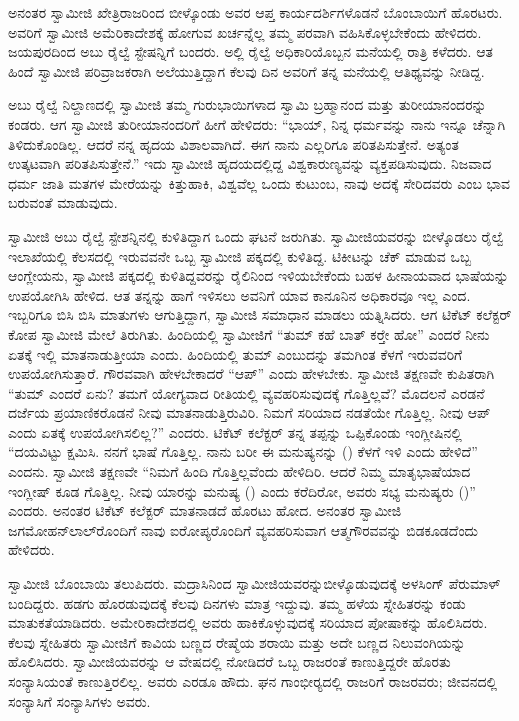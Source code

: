  ಅನಂತರ ಸ್ವಾಮೀಜಿ ಖೇತ್ರಿರಾಜರಿಂದ ಬೀಳ್ಕೊಂಡು ಅವರ ಆಪ್ತ ಕಾರ್ಯದರ್ಶಿಗಳೊಡನೆ ಬೊಂಬಾಯಿಗೆ ಹೊರಟರು. ಅವರಿಗೆ ಸ್ವಾಮೀಜಿ ಅಮೆರಿಕಾದೇಶಕ್ಕೆ ಹೋಗುವ ಖರ್ಚನ್ನೆಲ್ಲ ತಮ್ಮ ಪರವಾಗಿ ವಹಿಸಿಕೊಳ್ಳಬೇಕೆಂದು ಹೇಳಿದರು. ಜಯಪುರದಿಂದ ಅಬು ರೈಲ್ವೆ ಸ್ಟೇಷನ್ನಿಗೆ ಬಂದರು. ಅಲ್ಲಿ ರೈಲ್ವೆ ಅಧಿಕಾರಿಯೊಬ್ಬನ ಮನೆಯಲ್ಲಿ ರಾತ್ರಿ ಕಳೆದರು. ಆತ ಹಿಂದೆ ಸ್ವಾಮೀಜಿ ಪರಿವ್ರಾಜಕರಾಗಿ ಅಲೆಯುತ್ತಿದ್ದಾಗ ಕೆಲವು ದಿನ ಅವರಿಗೆ ತನ್ನ ಮನೆಯಲ್ಲಿ ಆತಿಥ್ಯವನ್ನು ನೀಡಿದ್ದ. 

ಅಬು ರೈಲ್ವೆ ನಿಲ್ದಾಣದಲ್ಲಿ ಸ್ವಾಮೀಜಿ ತಮ್ಮ ಗುರುಭಾಯಿಗಳಾದ ಸ್ವಾಮಿ ಬ್ರಹ್ಮಾನಂದ ಮತ್ತು ತುರೀಯಾನಂದರನ್ನು ಕಂಡರು. ಆಗ ಸ್ವಾಮೀಜಿ ತುರೀಯಾನಂದರಿಗೆ ಹೀಗೆ ಹೇಳಿದರು: “ಭಾಯ್, ನಿನ್ನ ಧರ್ಮವನ್ನು ನಾನು ಇನ್ನೂ ಚೆನ್ನಾಗಿ ತಿಳಿದುಕೊಂಡಿಲ್ಲ. ಆದರೆ ನನ್ನ ಹೃದಯ ವಿಶಾಲವಾಗಿದೆ. ಈಗ ನಾನು ಎಲ್ಲರಿಗೂ ಪರಿತಪಿಸುತ್ತೇನೆ. ಅತ್ಯಂತ ಉತ್ಕಟವಾಗಿ ಪರಿತಪಿಸುತ್ತೇನೆ.” ಇದು ಸ್ವಾಮೀಜಿ ಹೃದಯದಲ್ಲಿದ್ದ ವಿಶ್ವಕಾರುಣ್ಯವನ್ನು ವ್ಯಕ್ತಪಡಿಸುವುದು. ನಿಜವಾದ ಧರ್ಮ ಜಾತಿ ಮತಗಳ ಮೇರೆಯನ್ನು ಕಿತ್ತುಹಾಕಿ, ವಿಶ್ವವೆಲ್ಲ ಒಂದು ಕುಟುಂಬ, ನಾವು ಅದಕ್ಕೆ ಸೇರಿದವರು ಎಂಬ ಭಾವ ಬರುವಂತೆ ಮಾಡುವುದು. 

 ಸ್ವಾಮೀಜಿ ಅಬು ರೈಲ್ವೆ ಸ್ಟೇಶನ್ನಿನಲ್ಲಿ ಕುಳಿತಿದ್ದಾಗ ಒಂದು ಘಟನೆ ಜರುಗಿತು. ಸ್ವಾಮೀಜಿಯವರನ್ನು ಬೀಳ್ಕೊಡಲು ರೈಲ್ವೆ ಇಲಾಖೆಯಲ್ಲಿ ಕೆಲಸದಲ್ಲಿ ಇರುವವನೇ ಒಬ್ಬ ಸ್ವಾಮೀಜಿ ಪಕ್ಕದಲ್ಲಿ ಕುಳಿತಿದ್ದ. ಟಿಕೀಟನ್ನು ಚೆಕ್ ಮಾಡುವ ಒಬ್ಬ ಆಂಗ್ಲೇಯನು, ಸ್ವಾಮೀಜಿ ಪಕ್ಕದಲ್ಲಿ ಕುಳಿತಿದ್ದವರನ್ನು ರೈಲಿನಿಂದ ಇಳಿಯಬೇಕೆಂದು ಬಹಳ ಹೀನಾಯವಾದ ಭಾಷೆಯನ್ನು ಉಪಯೋಗಿಸಿ ಹೇಳಿದ. ಆತ ತನ್ನನ್ನು ಹಾಗೆ ಇಳಿಸಲು ಅವನಿಗೆ ಯಾವ ಕಾನೂನಿನ ಅಧಿಕಾರವೂ ಇಲ್ಲ ಎಂದ. ಇಬ್ಬರಿಗೂ ಬಿಸಿ ಬಿಸಿ ಮಾತುಗಳು ಆಗುತ್ತಿದ್ದಾಗ, ಸ್ವಾಮೀಜಿ ಸಮಾಧಾನ ಮಾಡಲು ಯತ್ನಿಸಿದರು. ಆಗ ಟಿಕೆಟ್ ಕಲೆಕ್ಟರ್ ಕೋಪ ಸ್ವಾಮೀಜಿ ಮೇಲೆ ತಿರುಗಿತು. ಹಿಂದಿಯಲ್ಲಿ ಸ್ವಾಮೀಜಿಗೆ “ತುಮ್ ಕಹೆ ಬಾತ್ ಕರ್‍ತೇ‌ ಹೋ” ಎಂದರೆ ನೀನು ಏತಕ್ಕೆ ಇಲ್ಲಿ ಮಾತನಾಡುತ್ತೀಯಾ ಎಂದು. ಹಿಂದಿಯಲ್ಲಿ ತುಮ್ ಎಂಬುದನ್ನು ತಮಗಿಂತ ಕೆಳಗೆ ಇರುವವರಿಗೆ ಉಪಯೋಗಿಸುತ್ತಾರೆ. ಗೌರವವಾಗಿ ಹೇಳಬೇಕಾದರೆ “ಆಪ್” ಎಂದು ಹೇಳಬೇಕು. ಸ್ವಾಮೀಜಿ ತಕ್ಷಣವೇ ಕುಪಿತರಾಗಿ “ತುಮ್ ಎಂದರೆ ಏನು? ತಮಗೆ ಯೋಗ್ಯವಾದ ರೀತಿಯಲ್ಲಿ ವ್ಯವಹರಿಸುವುದಕ್ಕೆ ಗೊತ್ತಿಲ್ಲವೆ? ಮೊದಲನೆ ಎರಡನೆ ದರ್ಜೆಯ ಪ್ರಯಾಣಿಕರೊಡನೆ ನೀವು ಮಾತನಾಡುತ್ತಿರುವಿರಿ. ನಿಮಗೆ ಸರಿಯಾದ ನಡತೆಯೇ ಗೊತ್ತಿಲ್ಲ. ನೀವು ಆಪ್ ಎಂದು ಏತಕ್ಕೆ ಉಪಯೋಗಿಸಲಿಲ್ಲ?” ಎಂದರು. ಟಿಕೆಟ್ ಕಲೆಕ್ಟರ್ ತನ್ನ ತಪ್ಪನ್ನು ಒಪ್ಪಿಕೊಂಡು ಇಂಗ್ಲೀಷಿನಲ್ಲಿ “ದಯವಿಟ್ಟು ಕ್ಷಮಿಸಿ. ನನಗೆ ಭಾಷೆ ಗೊತ್ತಿಲ್ಲ. ನಾನು ಬರೀ ಈ ಮನುಷ್ಯನನ್ನು () ಕೆಳಗೆ ಇಳಿ ಎಂದು ಹೇಳಿದೆ” ಎಂದನು. ಸ್ವಾಮೀಜಿ ತಕ್ಷಣವೇ‌ “ನಿಮಗೆ ಹಿಂದಿ ಗೊತ್ತಿಲ್ಲವೆಂದು ಹೇಳಿದಿರಿ. ಆದರೆ ನಿಮ್ಮ ಮಾತೃಭಾಷೆಯಾದ ಇಂಗ್ಲೀಷ್ ಕೂಡ ಗೊತ್ತಿಲ್ಲ. ನೀವು ಯಾರನ್ನು ಮನುಷ್ಯ () ಎಂದು ಕರೆದಿರೋ, ಅವರು ಸಭ್ಯ ಮನುಷ್ಯರು ()” ಎಂದರು. ಅನಂತರ ಟಿಕೆಟ್ ಕಲೆಕ್ಟರ್ ಮಾತನಾಡದೆ ಹೊರಟು ಹೋದ. ಅನಂತರ ಸ್ವಾಮೀಜಿ ಜಗಮೋಹನ್‍ಲಾಲ್‍ರೊಂದಿಗೆ ನಾವು ಐರೋಪ್ಯರೊಂದಿಗೆ ವ್ಯವಹರಿಸುವಾಗ ಆತ್ಮಗೌರವವನ್ನು ಬಿಡಕೂಡದೆಂದು ಹೇಳಿದರು. 

 ಸ್ವಾಮೀಜಿ ಬೊಂಬಾಯಿ ತಲುಪಿದರು. ಮದ್ರಾಸಿನಿಂದ ಸ್ವಾಮೀಜಿಯವರನ್ನು\break ಬೀಳ್ಕೊಡುವುದಕ್ಕೆ ಅಳಸಿಂಗ್ ಪೆರುಮಾಳ್ ಬಂದಿದ್ದರು. ಹಡಗು ಹೊರಡುವುದಕ್ಕೆ ಕೆಲವು ದಿನಗಳು ಮಾತ್ರ ಇದ್ದುವು. ತಮ್ಮ ಹಳೆಯ ಸ್ನೇಹಿತರನ್ನು ಕಂಡು ಮಾತುಕತೆಯಾಡಿದರು. ಅಮೇರಿಕಾದೇಶದಲ್ಲಿ ಅವರು ಹಾಕಿಕೊಳ್ಳುವುದಕ್ಕೆ ಸರಿಯಾದ ಪೋಷಾಕನ್ನು ಹೊಲಿಸಿದರು. ಕೆಲವು ಸ್ನೇಹಿತರು ಸ್ವಾಮೀಜಿಗೆ ಕಾವಿಯ ಬಣ್ಣದ ರೇಷ್ಮೆಯ ಶರಾಯಿ ಮತ್ತು ಅದೇ ಬಣ್ಣದ ನಿಲುವಂಗಿಯನ್ನು ಹೊಲಿಸಿದರು. ಸ್ವಾಮೀಜಿಯವರನ್ನು ಆ ವೇಷದಲ್ಲಿ ನೋಡಿದರೆ ಒಬ್ಬ ರಾಜರಂತೆ ಕಾಣುತ್ತಿದ್ದರೇ ಹೊರತು ಸಂನ್ಯಾಸಿಯಂತೆ ಕಾಣುತ್ತಿರಲಿಲ್ಲ. ಅವರು ಎರಡೂ ಹೌದು. ಘನ ಗಾಂಭೀರ‍್ಯದಲ್ಲಿ ರಾಜರಿಗೆ ರಾಜರವರು; ಜೀವನದಲ್ಲಿ ಸಂನ್ಯಾಸಿಗೆ ಸಂನ್ಯಾಸಿಗಳು ಅವರು. 

